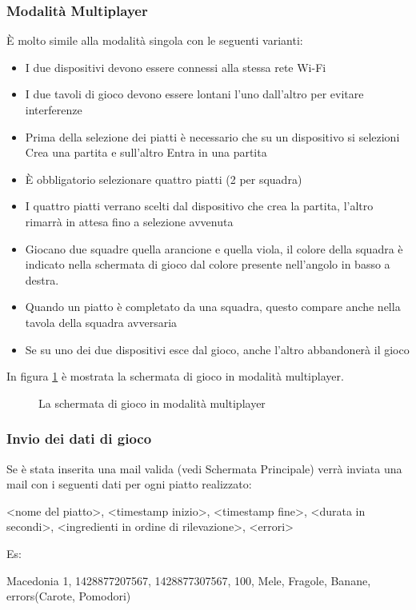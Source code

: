 \subsubsection{Modalità Multiplayer}
È molto simile alla modalità singola con le seguenti varianti:
\begin{itemize}
\item I due dispositivi devono essere connessi alla stessa rete Wi-Fi
\item I due tavoli di gioco devono essere lontani l’uno dall’altro per evitare interferenze
\item Prima della selezione dei piatti è necessario che su un dispositivo si selezioni Crea una partita e sull’altro Entra in una partita
\item È obbligatorio selezionare quattro piatti (2 per squadra)
\item I quattro piatti verrano scelti dal dispositivo che crea la partita, l’altro rimarrà in attesa fino a selezione avvenuta
\item Giocano due squadre quella arancione e quella viola, il colore della squadra è indicato nella schermata di gioco dal colore presente nell’angolo in basso a destra.
\item Quando un piatto è completato da una squadra, questo compare anche nella tavola della squadra avversaria
\item Se su uno dei due dispositivi esce dal gioco, anche l’altro abbandonerà il gioco
\end{itemize}
In figura \ref{fig:screen3} è mostrata la schermata di gioco in modalità multiplayer.

\begin{figure}[h!]
\label{fig:screen3}
\centering
{}
\caption{La schermata di gioco in modalità multiplayer}
\end{figure}

\subsubsection{Invio dei dati di gioco}

Se è stata inserita una mail valida (vedi Schermata Principale) verrà inviata una mail con i seguenti dati per ogni piatto realizzato:

\textless nome del piatto\textgreater, \textless timestamp inizio\textgreater, \textless timestamp fine\textgreater, \textless durata in secondi\textgreater, \textless ingredienti in ordine di rilevazione\textgreater, \textless errori\textgreater

Es:

Macedonia 1, 1428877207567, 1428877307567, 100, Mele, Fragole, Banane, errors(Carote, Pomodori)
